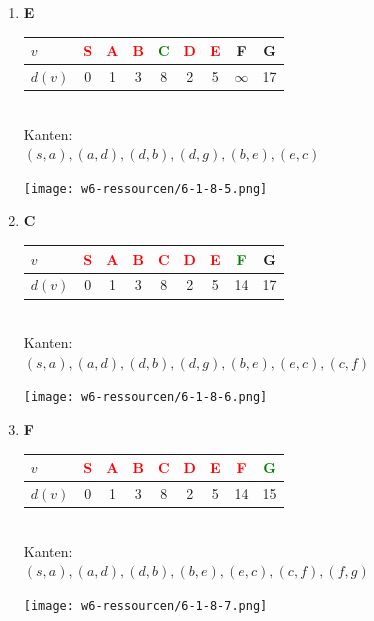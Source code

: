 \documentclass{article}
\begin{document}
\begin{enumerate}
	\item \textbf{E}\\
	\begin{minipage}[t]{0.48\textwidth}
		\begin{tabular}{l||c|c|c|c|c|c|c|c}
			$v$		&	\textcolor{red}{S}	&	\textcolor{red}{A}	&	\textcolor{red}{B}	&	\textcolor{green}{C}	&	\textcolor{red}{D}	&	\textcolor{red}{E}	&	F	&	G	\\	\hline
			$d(v)$	&	0	&	1	&	3	&	8	&	2	&	5	&	$\infty$	&	17
		\end{tabular}\\
		Kanten:\\
		$(s,a),(a,d),(d,b),(d,g),(b,e),(e,c)$
	\end{minipage}
	\begin{minipage}[t]{0.48\textwidth}
		\texttt{[image: w6-ressourcen/6-1-8-5.png]}
	\end{minipage}
	
	\item \textbf{C}\\
	\begin{minipage}[t]{0.48\textwidth}
		\begin{tabular}{l||c|c|c|c|c|c|c|c}
			$v$		&	\textcolor{red}{S}	&	\textcolor{red}{A}	&	\textcolor{red}{B}	&	\textcolor{red}{C}	&	\textcolor{red}{D}	&	\textcolor{red}{E}	&	\textcolor{green}{F}	&	G	\\	\hline
			$d(v)$	&	0	&	1	&	3	&	8	&	2	&	5	&	14	&	17
		\end{tabular}\\
		Kanten:\\
		$(s,a),(a,d),(d,b),(d,g),(b,e),(e,c),(c,f)$
	\end{minipage}
	\begin{minipage}[t]{0.48\textwidth}
		\texttt{[image: w6-ressourcen/6-1-8-6.png]}
	\end{minipage}
	
	\item \textbf{F}\\
	\begin{minipage}[t]{0.48\textwidth}
		\begin{tabular}{l||c|c|c|c|c|c|c|c}
			$v$		&	\textcolor{red}{S}	&	\textcolor{red}{A}	&	\textcolor{red}{B}	&	\textcolor{red}{C}	&	\textcolor{red}{D}	&	\textcolor{red}{E}	&	\textcolor{red}{F}	&	\textcolor{green}{G}	\\	\hline
			$d(v)$	&	0	&	1	&	3	&	8	&	2	&	5	&	14	&	15
		\end{tabular}\\
		Kanten:\\
		$(s,a),(a,d),(d,b),(b,e),(e,c),(c,f),(f,g)$
	\end{minipage}
	\begin{minipage}[t]{0.48\textwidth}
		\texttt{[image: w6-ressourcen/6-1-8-7.png]}
	\end{minipage}
	

\end{enumerate}
\end{document}
